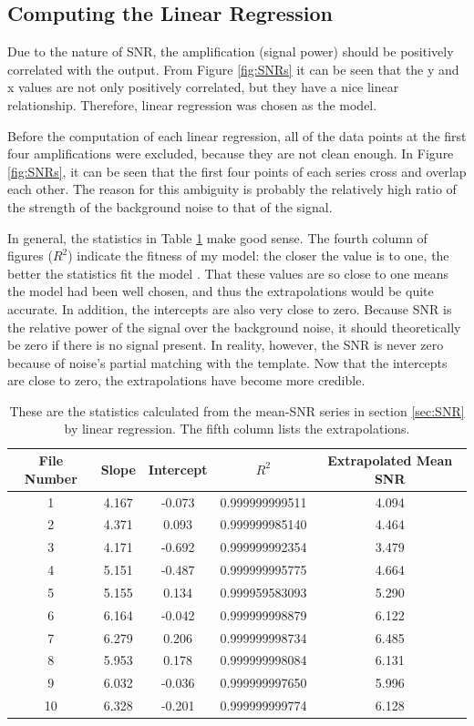 \documentclass[aps,prd,preprint]{revtex4}
\begin{document}
\subsection{Computing the Linear Regression \label{sec:reg}}
Due to the nature of SNR, the amplification (signal power) should be positively correlated with the output. From Figure \ref{fig:SNRs} it can be seen that the y and x values are not only positively correlated, but they have a nice linear relationship. Therefore, linear regression \cite{linereg} was chosen as the model.
\par Before the computation of each linear regression, all of the data points at the first four amplifications were excluded, because they are not clean enough. In Figure \ref{fig:SNRs}, it can be seen that the first four points of each series cross and overlap each other. The reason for this ambiguity is probably the relatively high ratio of the strength of the background noise to that of the signal.
\par In general, the statistics in Table \ref{tab:extrapolation} make good sense. The fourth column of figures ($R^2$) indicate the fitness of my model: the closer the value is to one, the better the statistics fit the model \cite{r_squared}. That these values are so close to one means the model had been well chosen, and thus the extrapolations would be quite accurate. In addition, the intercepts are also very close to zero. Because SNR is the relative power of the signal over the background noise, it should theoretically be zero if there is no signal present. In reality, however, the SNR is never zero because of noise's partial matching with the template. Now that the intercepts are close to zero, the extrapolations have become more credible.
\begin{table}
	\caption{These are the statistics calculated from the mean-SNR series in section \ref{sec:SNR} by linear regression. The fifth column lists the extrapolations. \label{tab:extrapolation}}
	\begin{tabular}{ccccc}
		\hline
		\hline
		File Number & Slope & Intercept & $R^2$ & Extrapolated Mean SNR \\
		\hline
		1 & 4.167  & -0.073  & 0.999999999511  & 4.094  \\
		2 & 4.371  & 0.093  & 0.999999985140  & 4.464  \\
		3 & 4.171  & -0.692  & 0.999999992354  & 3.479  \\
		4 & 5.151  & -0.487  & 0.999999995775  & 4.664  \\
		5 & 5.155  & 0.134  & 0.999959583093  & 5.290  \\
		6 & 6.164  & -0.042  & 0.999999998879  & 6.122  \\
		7 & 6.279  & 0.206  & 0.999999998734  & 6.485  \\
		8 & 5.953  & 0.178  & 0.999999998084  & 6.131  \\
		9 & 6.032  & -0.036  & 0.999999997650  & 5.996  \\
		10 & 6.328  & -0.201  & 0.999999999774  & 6.128  \\
		\hline
		\hline
	\end{tabular}
\end{table}
\end{document}
